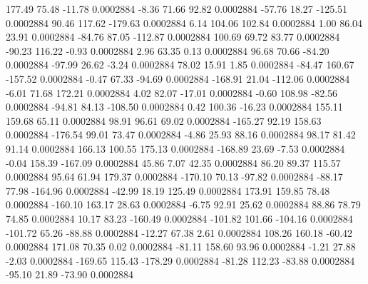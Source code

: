       177.49       75.48      -11.78     0.0002884
       -8.36       71.66       92.82     0.0002884
      -57.76       18.27     -125.51     0.0002884
       90.46      117.62     -179.63     0.0002884
        6.14      104.06      102.84     0.0002884
        1.00       86.04       23.91     0.0002884
      -84.76       87.05     -112.87     0.0002884
      100.69       69.72       83.77     0.0002884
      -90.23      116.22       -0.93     0.0002884
        2.96       63.35        0.13     0.0002884
       96.68       70.66      -84.20     0.0002884
      -97.99       26.62       -3.24     0.0002884
       78.02       15.91        1.85     0.0002884
      -84.47      160.67     -157.52     0.0002884
       -0.47       67.33      -94.69     0.0002884
     -168.91       21.04     -112.06     0.0002884
       -6.01       71.68      172.21     0.0002884
        4.02       82.07      -17.01     0.0002884
       -0.60      108.98      -82.56     0.0002884
      -94.81       84.13     -108.50     0.0002884
        0.42      100.36      -16.23     0.0002884
      155.11      159.68       65.11     0.0002884
       98.91       96.61       69.02     0.0002884
     -165.27       92.19      158.63     0.0002884
     -176.54       99.01       73.47     0.0002884
       -4.86       25.93       88.16     0.0002884
       98.17       81.42       91.14     0.0002884
      166.13      100.55      175.13     0.0002884
     -168.89       23.69       -7.53     0.0002884
       -0.04      158.39     -167.09     0.0002884
       45.86        7.07       42.35     0.0002884
       86.20       89.37      115.57     0.0002884
       95.64       61.94      179.37     0.0002884
     -170.10       70.13      -97.82     0.0002884
      -88.17       77.98     -164.96     0.0002884
      -42.99       18.19      125.49     0.0002884
      173.91      159.85       78.48     0.0002884
     -160.10      163.17       28.63     0.0002884
       -6.75       92.91       25.62     0.0002884
       88.86       78.79       74.85     0.0002884
       10.17       83.23     -160.49     0.0002884
     -101.82      101.66     -104.16     0.0002884
     -101.72       65.26      -88.88     0.0002884
      -12.27       67.38        2.61     0.0002884
      108.26      160.18      -60.42     0.0002884
      171.08       70.35        0.02     0.0002884
      -81.11      158.60       93.96     0.0002884
       -1.21       27.88       -2.03     0.0002884
     -169.65      115.43     -178.29     0.0002884
      -81.28      112.23      -83.88     0.0002884
      -95.10       21.89      -73.90     0.0002884

